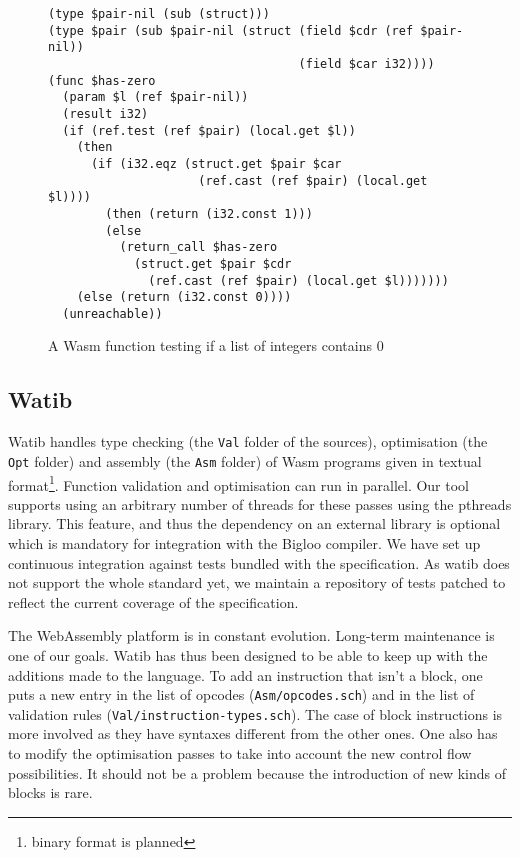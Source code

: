 \documentclass[a4paper,11pt]{article}
\begin{document}
\begin{figure}[h]
  \begin{minipage}{\widthof{(type \$pair (sub \$pair-nil (struct (field \$cdr (ref \$pair-nil))}}
\begin{lstlisting}
(type $pair-nil (sub (struct)))
(type $pair (sub $pair-nil (struct (field $cdr (ref $pair-nil))
                                   (field $car i32))))
(func $has-zero
  (param $l (ref $pair-nil))
  (result i32)
  (if (ref.test (ref $pair) (local.get $l))
    (then
      (if (i32.eqz (struct.get $pair $car
                     (ref.cast (ref $pair) (local.get $l))))
        (then (return (i32.const 1)))
        (else
          (return_call $has-zero
            (struct.get $pair $cdr
              (ref.cast (ref $pair) (local.get $l)))))))
    (else (return (i32.const 0))))
  (unreachable))
\end{lstlisting}
  \end{minipage}

  \caption{A Wasm function testing if a list of integers contains 0}\label{ex}
\end{figure}

\subsection{Watib}
\textsf{Watib} handles type checking (the \texttt{Val} folder of the sources),
optimisation (the \texttt{Opt} folder) and assembly (the \texttt{Asm} folder) of
Wasm programs given in textual format\footnote{binary format is planned}.
Function validation and optimisation can run in parallel. Our tool supports
using an arbitrary number of threads for these passes using the
\textsf{pthreads} library. This feature, and thus the dependency on an external
library is optional which is mandatory for integration with the Bigloo compiler.
We have set up continuous integration against tests bundled with the
specification. As \textsf{watib} does not support the whole standard yet, we
maintain a repository of tests patched to reflect the current coverage of the
specification.

The WebAssembly platform is in constant evolution. Long-term maintenance is one
of our goals. \textsf{Watib} has thus been designed to be able to keep up with
the additions made to the language. To add an instruction that isn't a block,
one puts a new entry in the list of opcodes (\texttt{Asm/opcodes.sch}) and in
the list of validation rules (\texttt{Val/instruction-types.sch}). The case of
block instructions is more involved as they have syntaxes different from the
other ones. One also has to modify the optimisation passes to take into account
the new control flow possibilities. It should not be a problem because the
introduction of new kinds of blocks is rare.
\end{document}
